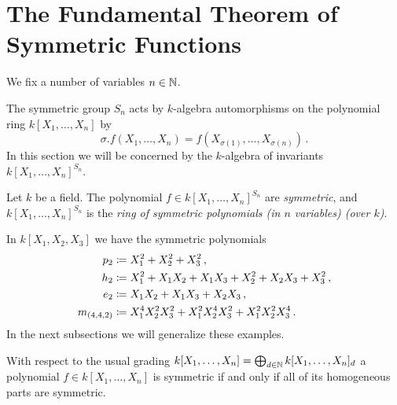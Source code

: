 \section{The Fundamental Theorem of Symmetric Functions}


\begin{conventions}
  We fix a number of variables $n \in \mathbb{N}$.
\end{conventions}


\begin{fluff}
  The symmetric group $S_n$ acts by $k$-algebra automorphisms on the polynomial ring $k[X_1, \dotsc, X_n]$ by
  \[
      \sigma.f(X_1, \dotsc, X_n)
    = f(X_{\sigma(1)}, \dotsc, X_{\sigma(n)}) \,.
  \]
  In this section we will be concerned by the $k$-algebra of invariants $k[X_1, \dotsc, X_n]^{S_n}$.
\end{fluff}


\begin{definition}
  Let $k$ be a field.
  The polynomial $f \in k[X_1, \dotsc, X_n]^{S_n}$ are \emph{symmetric}, and $k[X_1, \dotsc, X_n]^{S_n}$ is the \emph{ring of symmetric polynomials \textup(in $n$ variables\textup) \textup(over $k$\textup)}.
\end{definition}


\begin{example}
  \label{example: symmetric polynomials}
  In $k[X_1, X_2, X_3]$ we have the symmetric polynomials
  \begin{align*}
              p_2
    &\coloneqq X_1^2 + X_2^2 + X_3^2 \,,
    \\
              h_2
    &\coloneqq X_1^2 + X_1 X_2 + X_1 X_3 + X_2^2 + X_2 X_3 + X_3^2 \,,
    \\
              e_2
    &\coloneqq X_1 X_2 + X_1 X_3 + X_2 X_3 \,,
    \\
              m_{(4,4,2)}
    &\coloneqq X_1^4 X_2^2 X_3^2 + X_1^2 X_2^4 X_3^2 + X_1^2 X_2^2 X_3^4 \,.
  \end{align*}
  In the next subsections we will generalize these examples.
\end{example}


\begin{lemma}
  \label{lemma: symmetric iff all homogeneous parts are symmetric}
  With respect to the usual grading $k[X_1, \dotsc, X_n] = \bigoplus_{d \in \mathbb{N}} k[X_1, \dotsc, X_n]_d$ a polynomial $f \in k[X_1, \dotsc, X_n]$ is symmetric if and only if all of its homogeneous parts are symmetric.
\end{lemma}


